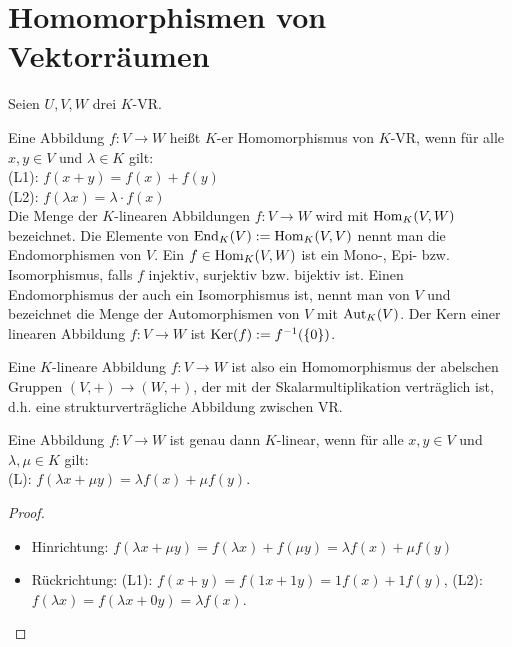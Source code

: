 \section{Homomorphismen von Vektorräumen}

Seien $U,V,W$ drei $K$-VR. \\

\begin{definition}[linear]
	Eine Abbildung $f: V \to W$ heißt $K$-er Homomorphismus von $K$-VR, wenn für 
	alle $x,y\in V$ und $\lambda\in K$ gilt: \\
	(L1): $f(x+y)=f(x)+f(y)$ \\
	(L2): $f(\lambda x)=\lambda \cdot f(x)$ \\
	Die Menge der $K$-linearen Abbildungen $f: V\to W$ wird mit $\operatorname{Hom}_K(V,W)$ bezeichnet. Die Elemente von $\operatorname{End}_K(V)
	:= \operatorname{Hom}_K(V,V)$ nennt man die Endomorphismen von $V$. Ein $f\in \operatorname{Hom}_K(V,W)$ ist ein Mono-, Epi- bzw. Isomorphismus, 
	falls $f$ injektiv, surjektiv bzw. bijektiv ist. Einen Endomorphismus der auch ein Isomorphismus ist, nennt man 
	 von $V$ und bezeichnet die Menge der Automorphismen von $V$ mit $\operatorname{Aut}_K(V)$. Der Kern einer linearen 
	Abbildung $f: V\to W$ ist $\operatorname{Ker}(f):= f^{-1}(\{0\})$.
\end{definition}

\begin{remark}
	Eine $K$-lineare Abbildung $f: V\to W$ ist also ein Homomorphismus der abelschen Gruppen $(V,+) 
	\to(W,+)$, der mit der Skalarmultiplikation verträglich ist, d.h. eine strukturverträgliche Abbildung zwischen VR.
\end{remark}

\begin{proposition}
	Eine Abbildung $f: V\to W$ ist genau dann $K$-linear, wenn für alle $x,y\in V$ und $\lambda,
	\mu\in K$ gilt: \\
	(L): $f(\lambda x +\mu y)=\lambda f(x) + \mu f(y)$.
\end{proposition}
\begin{proof}
	\begin{itemize}
		\item Hinrichtung: $f(\lambda x +\mu y)=f(\lambda x) + f(\mu y)=\lambda f(x) + \mu f(y)$
		\item Rückrichtung: (L1): $f(x+y)=f(1x+1y)=1f(x)+1f(y)$, (L2): $f(\lambda x)=f(\lambda x+0y)=\lambda f(x)$.
	\end{itemize}
\end{proof}

